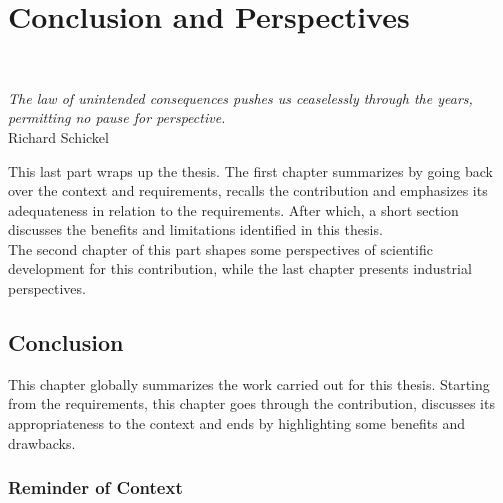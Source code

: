 \part{Conclusion and Perspectives}

~\vspace{1cm}
\begin{flushright}
{\it The law of unintended consequences pushes us ceaselessly through the years, permitting no pause for perspective.}\\
Richard Schickel
\end{flushright}
\vspace{2cm}

This last part wraps up the thesis. The first chapter summarizes by going back over the context and requirements, recalls the contribution and emphasizes its adequateness in relation to the requirements. After which, a short section discusses the benefits and limitations identified in this thesis.\\
The second chapter of this part shapes some perspectives of scientific development for this contribution, while the last chapter presents industrial perspectives. 

\chapter{Conclusion}

This chapter globally summarizes the work carried out for this thesis. Starting from the requirements, this chapter goes through the contribution, discusses its appropriateness to the context and ends by highlighting some benefits and drawbacks.

\section{Reminder of Context}

